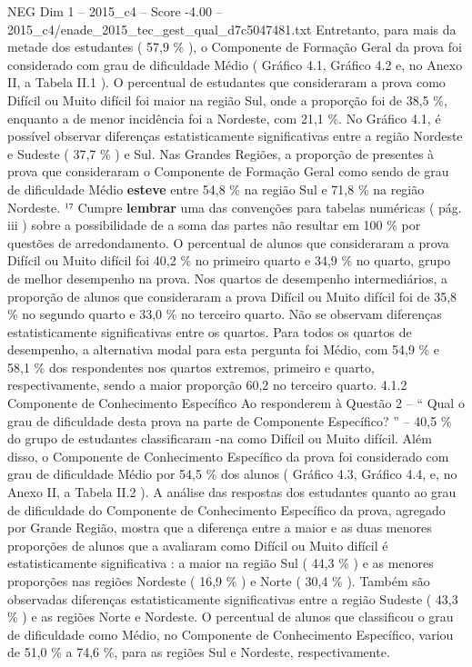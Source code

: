 \begin{textsample}{NEG Dim 1 – 2015\_c4 – Score -4.00 – 2015\_c4/enade\_2015\_tec\_gest\_qual\_d7c5047481.txt}
Entretanto, para mais da metade dos estudantes ( 57,9 \% ), o Componente de Formação Geral da prova foi considerado com grau de dificuldade Médio ( Gráfico 4.1, Gráfico 4.2 e, no Anexo II, a Tabela II.1 ).
O percentual de estudantes que consideraram a prova como Difícil ou Muito difícil foi maior na região Sul, onde a proporção foi de 38,5 \%, enquanto a de menor incidência foi a Nordeste, com 21,1 \%.
No Gráfico 4.1, é possível observar diferenças estatisticamente significativas entre a região Nordeste e Sudeste ( 37,7 \% ) e Sul.
Nas Grandes Regiões, a proporção de presentes à prova que consideraram o Componente de Formação Geral como sendo de grau de dificuldade Médio \textbf{esteve} entre 54,8 \% na região Sul e 71,8 \% na região Nordeste. ¹⁷ Cumpre \textbf{lembrar} uma das convenções para tabelas numéricas ( pág. iii ) sobre a possibilidade de a soma das partes não resultar em 100 \% por questões de arredondamento.
O percentual de alunos que consideraram a prova Difícil ou Muito difícil foi 40,2 \% no primeiro quarto e 34,9 \% no quarto, grupo de melhor desempenho na prova.
Nos quartos de desempenho intermediários, a proporção de alunos que consideraram a prova Difícil ou Muito difícil foi de 35,8 \% no segundo quarto e 33,0 \% no terceiro quarto.
Não se observam diferenças estatisticamente significativas entre os quartos.
Para todos os quartos de desempenho, a alternativa modal para esta pergunta foi Médio, com 54,9 \% e 58,1 \% dos respondentes nos quartos extremos, primeiro e quarto, respectivamente, sendo a maior proporção 60,2 no terceiro quarto. 4.1.2 Componente de Conhecimento Específico Ao responderem à Questão 2 – “ Qual o grau de dificuldade desta prova na parte de Componente Específico? ” – 40,5 \% do grupo de estudantes classificaram -na como Difícil ou Muito difícil.
Além disso, o Componente de Conhecimento Específico da prova foi considerado com grau de dificuldade Médio por 54,5 \% dos alunos ( Gráfico 4.3, Gráfico 4.4, e, no Anexo II, a Tabela II.2 ).
A análise das respostas dos estudantes quanto ao grau de dificuldade do Componente de Conhecimento Específico da prova, agregado por Grande Região, mostra que a diferença entre a maior e as duas menores proporções de alunos que a avaliaram como Difícil ou Muito difícil é estatisticamente significativa : a maior na região Sul ( 44,3 \% ) e as menores proporções nas regiões Nordeste ( 16,9 \% ) e Norte ( 30,4 \% ).
Também são observadas diferenças estatisticamente significativas entre a região Sudeste ( 43,3 \% ) e as regiões Norte e Nordeste.
O percentual de alunos que classificou o grau de dificuldade como Médio, no Componente de Conhecimento Específico, variou de 51,0 \% a 74,6 \%, para as regiões Sul e Nordeste, respectivamente.

\end{textsample}

